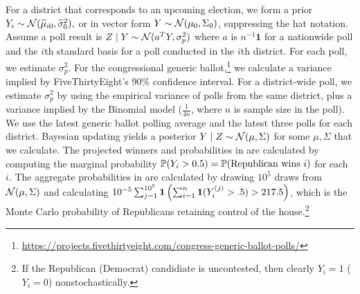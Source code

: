 \documentclass[12pt]{article}
\begin{document}
For a district that corresponds to an upcoming election, we form a prior 
$Y_i\sim \Norm(\hat \mu_{i0}, \hat \sigma_0^2),$ or in vector form $
Y \sim \Norm( \mu_0,  \Sigma_0)$, suppressing the hat notation. Assume a poll result is $Z \mid Y \sim \Norm(a^T Y, \sigma^2_p)$ where $a$ is $n^{-1}\bm 1$ for a nationwide poll and the $i$th standard basis for a poll conducted in the $i$th district. For each poll, we estimate $\sigma^2_p$. For the congressional generic ballot,\footnote{\url{https://projects.fivethirtyeight.com/congress-generic-ballot-polls/}} we calculate a variance implied by FiveThirtyEight's 90\% confidence interval. For a district-wide poll, we estimate $\sigma^2_p$ by using the empirical variance of polls from the same district, plus a variance implied by the Binomial model ($\frac{1}{4n}$, where $n$ is sample size in the poll). We use the latest generic ballot polling average and the latest three polls for each district. Bayesian updating yields a posterior $Y \mid Z \sim \Norm(\mu, \Sigma)$ for some $\mu, \Sigma$ that we calculate. The projected winners and probabilities in  are calculated by computing the marginal probability $\P(Y_i > 0.5) = \P(\text{Republican wins $i$})$ for each $i$. The aggregate probabilities in  are calculated by drawing $10^5$ draws from $\Norm(\mu,\Sigma)$ and calculating $10^{-5}\sum_{j=1}^{10^5} \bm 1\pr{\sum_{i=1}^{n} \bm 1(Y_i^{(j)} > .5) > 217.5}$, which is the Monte Carlo probability of Republicans retaining control of the house.\footnote{If the Republican (Democrat) candidiate is uncontested, then clearly $Y_i = 1$ ($Y_i = 0$) nonstochastically.}

\newpage

\end{document}
